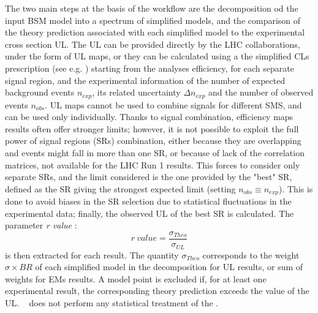 \documentclass[epj,nopacs,fleqn]{svjour}
\begin{document}
The two main steps at the basis of the \SMO workflow are the decomposition od the input BSM model into a spectrum of simplified models, and the comparison of the theory prediction associated with each simplified model to the experimental cross section UL. The UL can be provided directly by the LHC collaborations, under the form of UL maps, or they can be calculated using a the simplified CLs prescription (see e.g. \cite{Read:2002hq,Junk:1999kv}) starting from the analyses efficiency, for each separate signal region, and the experimental information of the number of expected background events $n_{exp}$, its related uncertainty $\Delta n_{exp}$ and the number of observed events $n_{obs}$. UL maps cannot be used to combine signals for different SMS, and can be used only individually. Thanks to signal combination, efficiency maps results often offer stronger limits; however, it is not possible to exploit the full power of signal regions (SRs) combination, either because they are overlapping and events might fall in more than one SR, or because of lack of the correlation matrices, not available for the LHC Run 1 results. This forces to consider only separate SRs, and the limit considered is the one provided by the "best" SR, defined as the SR giving the strongest expected limit (setting $n_{obs}\equiv n_{exp}$). This is done to avoid biases in the SR selection due to statistical fluctuations in the experimental data; finally, the observed UL of the best SR is calculated. The parameter \textit{r value }:
\begin{equation}\label{rvalue}
r \ value = \frac{\sigma_{Theo}}{\sigma_{UL}}
\end{equation}
is then extracted for each result. 
The quantity $\sigma_{Theo}$ corresponds to the weight $\sigma \times BR$ of each simplified model in the decomposition for UL results, or sum of weights for EMs results. A model point is excluded if, for at least one experimental result, the corresponding theory prediction exceeds the value of the UL. \SMO~ does not perform any statistical treatment of the \RVALUE.
%
\end{document}
